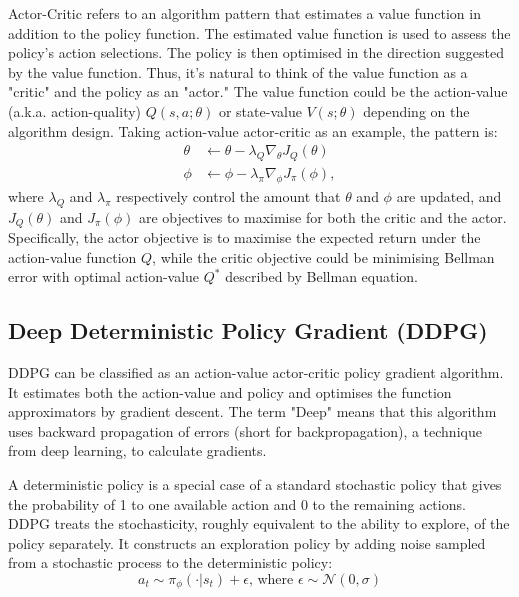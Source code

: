 {Actor-Critic refers to an algorithm pattern that estimates a value function in addition to the policy function. The estimated value function is used to assess the policy's action selections. The policy is then optimised in the direction suggested by the value function. Thus, it's natural to think of the value function as a "critic" and the policy as an "actor." The value function could be the action-value (a.k.a. action-quality) $Q(s,a;\theta)$ or state-value $V(s;\theta)$ depending on the algorithm design. Taking action-value actor-critic as an example, the pattern is:
\begin{align*}
\theta &\gets \theta - \lambda_Q\nabla_{\theta}J_Q(\theta) \\
\phi &\gets \phi - \lambda_\pi\nabla_{\phi}J_\pi(\phi),
\end{align*}
where $\lambda_Q$ and $\lambda_\pi$ respectively control the amount that $\theta$ and $\phi$ are updated, and $J_Q(\theta)$ and $J_\pi(\phi)$ are objectives to maximise for both the critic and the actor. Specifically, the actor objective is to maximise the expected return under the action-value function $Q$, while the critic objective could be minimising Bellman error with optimal action-value $Q^*$ described by Bellman equation.

\subsection{Deep Deterministic Policy Gradient (DDPG)}

DDPG can be classified as an action-value actor-critic policy gradient algorithm. It estimates both the action-value and policy and optimises the function approximators by gradient descent. The term "Deep" means that this algorithm uses backward propagation of errors (short for backpropagation), a technique from deep learning, to calculate gradients.

A deterministic policy is a special case of a standard stochastic policy that gives the probability of 1 to one available action and 0 to the remaining actions. DDPG treats the stochasticity, roughly equivalent to the ability to explore, of the policy separately. It constructs an exploration policy by adding noise sampled from a stochastic process to the deterministic policy:
\begin{displaymath}
a_t \sim \pi_\phi(\cdot|s_t) + \epsilon\text{, where } \epsilon \sim \mathcal{N}(0,\sigma)
\end{displaymath}

}

